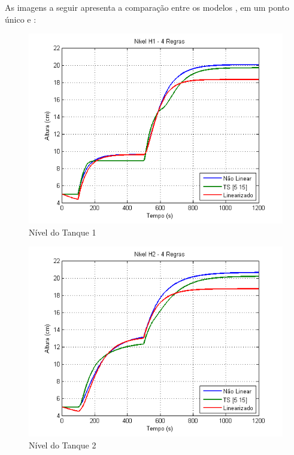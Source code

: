As imagens a seguir apresenta a comparação entre os modelos ,  em um ponto único e :

\begin{figure}[H]
	\centering
	\includegraphics[width=\textwidth]{img/h1_ts2_nm.png}
	\caption{\small Nível do Tanque 1}
	\label{figH1TS2_nm}
\end{figure}

\begin{figure}[H]
	\centering
	\includegraphics[width=\textwidth]{img/h2_ts2_nm.png}
	\caption{\small Nível do Tanque 2}
	\label{figH2TS2_nm}
\end{figure}

